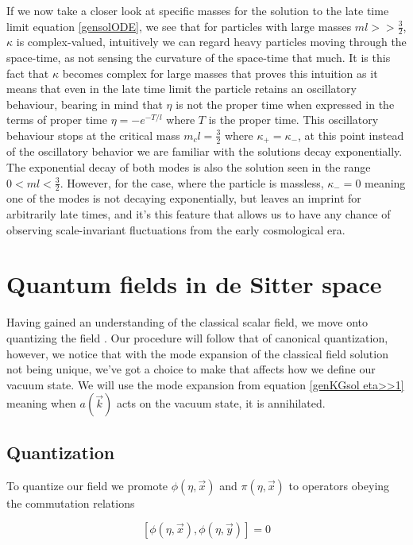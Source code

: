 \documentclass[a4paper,11pt]{article}
\numberwithin{equation}{section}
\numberwithin{figure}{section}
\begin{document}
\begin{large}
If we now take a closer look at specific masses for the solution to the late time limit equation \eqref{gensolODE}, we see that for particles with large masses  $ml>>\frac{3}{2}$, $\kappa$ is complex-valued, intuitively we can regard heavy particles moving through the space-time, as not sensing the curvature of the space-time that much. It is this fact that $\kappa$ becomes complex for large masses that proves this intuition as it means that even in the late time limit the particle retains an oscillatory behaviour, bearing in mind that $\eta$ is not the proper time when expressed in the terms of proper time $\eta=-e^{-T/l}$ where $T$ is the proper time. This oscillatory behaviour stops at the critical mass $m_cl=\frac{3}{2}$ where $\kappa_+=\kappa_-$, at this point instead of the oscillatory behavior we are familiar with the solutions decay exponentially. The exponential decay of both modes is also the solution seen in the range $0<ml<\frac{3}{2}$. However, for the case, where the particle is massless, $\kappa_-=0$ meaning one of the modes is not decaying exponentially, but leaves an imprint for arbitrarily late times, and it's this feature that allows us to have any chance of observing scale-invariant fluctuations from the early cosmological era.




\newpage

\section{Quantum fields in de Sitter space}

Having gained an understanding of the classical scalar field, we move onto quantizing the field \cite{ANNINOS_2012,Akhmedov:2013vka}. Our procedure will follow that of canonical quantization,
however, we notice that with the mode expansion of the classical field solution not being unique, we've got a choice to make that affects how we define our vacuum state. We will use the mode expansion from equation \eqref{genKGsol eta>>1} meaning when $a(\Vec{k})$ acts on the vacuum state, it is annihilated.


\subsection{Quantization}


To quantize our field we promote $\phi(\eta,\Vec{x})$ and $\pi(\eta,\Vec{x})$ to operators obeying the commutation relations

\begin{equation}
\label{cc1}
    [\phi(\eta,\Vec{x}),\phi(\eta,\Vec{y})]=0
\end{equation}


\end{large}
\end{document}
